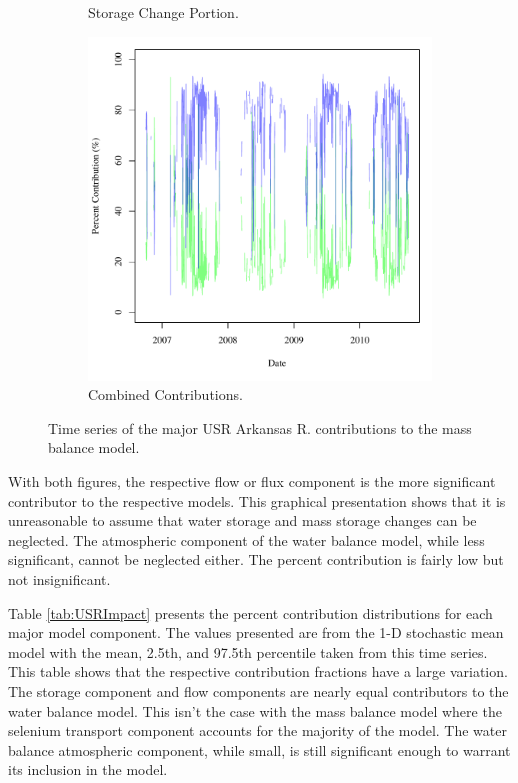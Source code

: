 \begin{linenumbers}
\begin{figure}[htbp]
\begin{subfigure}{0.5\textwidth}
		\caption{Storage Change Portion.}
		\label{sub:USRMStore}
	\end{subfigure}
	\begin{subfigure}{0.5\textwidth}
		\centering
		\includegraphics[width=0.9\linewidth]{"Figures/Results_USR/M Mass Contrib 3"}
		\caption{Combined Contributions.}
		\label{sub:USRMComb}
	\end{subfigure}
	\caption[Time series of the major USR Arkansas R. contributions to the mass balance model.]{Time series of the major USR Arkansas R. contributions to the mass balance model.}
	\label{fig:USRMassContrib}
\end{figure}

With both figures, the respective flow or flux component is the more significant contributor to the respective models.  This graphical presentation shows that it is unreasonable to assume that water storage and mass storage changes can be neglected.  The atmospheric component of the water balance model, while less significant, cannot be neglected either.  The percent contribution is fairly low but not insignificant.

Table \ref{tab:USRImpact} presents the percent contribution distributions for each major model component.  The values presented are from the 1-D stochastic mean model with the mean, 2.5th, and 97.5th percentile taken from this time series.  This table shows that the respective contribution fractions have a large variation.  The storage component and flow components are nearly equal contributors to the water balance model.  This isn't the case with the mass balance model where the selenium transport component accounts for the majority of the model.  The water balance atmospheric component, while small, is still significant enough to warrant its inclusion in the model.


\end{linenumbers}
